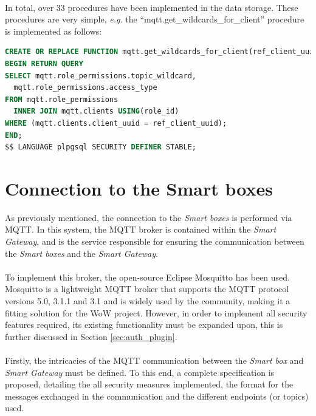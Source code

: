 \paragraph{} In total, over 33 procedures have been implemented in the data storage. These procedures are very simple, \textit{e.g.} the ``mqtt.get\_wildcards\_for\_client'' procedure is implemented as follows:

\begin{lstlisting}[language=sql]     
CREATE OR REPLACE FUNCTION mqtt.get_wildcards_for_client(ref_client_uuid uuid) RETURNS TABLE (topic_wildcard text, access_type int) AS $$ 
BEGIN RETURN QUERY
SELECT mqtt.role_permissions.topic_wildcard,
  mqtt.role_permissions.access_type
FROM mqtt.role_permissions
  INNER JOIN mqtt.clients USING(role_id)
WHERE (mqtt.clients.client_uuid = ref_client_uuid);
END;
$$ LANGUAGE plpgsql SECURITY DEFINER STABLE;
\end{lstlisting}

\section{Connection to the Smart boxes}


As previously mentioned, the connection to the \textit{Smart boxes} is performed via \acs{MQTT}. In this system, the \acs{MQTT} broker is contained within the \textit{Smart Gateway}, and is the service responsible for ensuring the communication between the \textit{Smart boxes} and the \textit{Smart Gateway}.

\paragraph{} To implement this broker, the open-source Eclipse Mosquitto \cite{mosquitto} has been used. Mosquitto is a lightweight \acs{MQTT} broker that supports the \acs{MQTT} protocol versions 5.0, 3.1.1 and 3.1 and is widely used by the community, making it a fitting solution for the \acs{WoW} project. However, in order to implement all security features required, its existing functionality must be expanded upon, this is further discussed in Section \ref{sec:auth_plugin}.

\paragraph{} Firstly, the intricacies of the \acs{MQTT} communication between the \textit{Smart box} and \textit{Smart Gateway} must be defined. To this end, a complete specification is proposed, detailing the all security measures implemented, the format for the messages exchanged in the communication and the different endpoints (or topics) used. 

